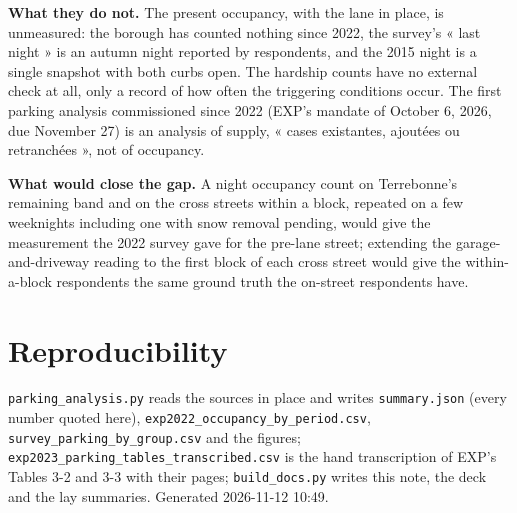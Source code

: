 \documentclass[11pt,a4paper]{article}
\begin{document}
\textbf{What they do not.} The present occupancy, with the lane in place, is unmeasured: the borough has counted nothing since 2022, the survey\textquoteright{}s « last night » is an autumn night reported by respondents, and the 2015 night is a single snapshot with both curbs open. The hardship counts have no external check at all, only a record of how often the triggering conditions occur. The first parking analysis commissioned since 2022 (EXP\textquoteright{}s mandate of October 6, 2026, due November 27) is an analysis of supply, « cases existantes, ajoutées ou retranchées », not of occupancy.

\textbf{What would close the gap.} A night occupancy count on Terrebonne\textquoteright{}s remaining band and on the cross streets within a block, repeated on a few weeknights including one with snow removal pending, would give the measurement the 2022 survey gave for the pre-lane street; extending the garage-and-driveway reading to the first block of each cross street would give the within-a-block respondents the same ground truth the on-street respondents have.

\section{Reproducibility}
\texttt{parking\_analysis.py} reads the sources in place and writes \texttt{summary.json} (every number quoted here), \texttt{exp2022\_occupancy\_by\_period.csv}, \texttt{survey\_parking\_by\_group.csv} and the figures; \texttt{exp2023\_parking\_tables\_transcribed.csv} is the hand transcription of EXP\textquoteright{}s Tables 3-2 and 3-3 with their pages; \texttt{build\_docs.py} writes this note, the deck and the lay summaries. Generated 2026-11-12 10:49.
\end{document}
